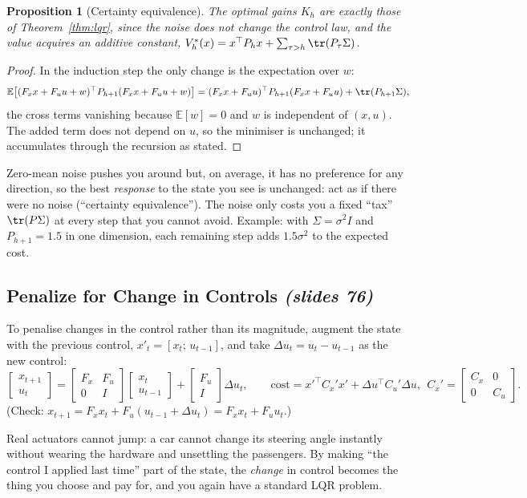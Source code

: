 \documentclass[11pt,a4paper]{article}
\newcommand{\E}{\mathbb{E}}
\newcommand{\slides}[1]{\emph{(slides #1)}}
\theoremstyle{plain}
\newtheorem{proposition}[theorem]{Proposition}
\theoremstyle{definition}
\theoremstyle{remark}
\begin{document}
\begin{proposition}[Certainty equivalence]\label{prop:ce}
The optimal gains $K_h$ are exactly those of Theorem~\ref{thm:lqr}, since the noise does not change the control law, and the value acquires an additive constant, $V^*_h(x)=x^\top P_hx+\sum_{\tau>h}\tr(P_\tau\Sigma)$.
\end{proposition}
\begin{proof}
In the induction step the only change is the expectation over $w$:
\[
\E\big[(F_xx+F_uu+w)^\top P_{h+1}(F_xx+F_uu+w)\big]=(F_xx+F_uu)^\top P_{h+1}(F_xx+F_uu)+\tr(P_{h+1}\Sigma),
\]
the cross terms vanishing because $\E[w]=0$ and $w$ is independent of $(x,u)$. The added term does not depend on $u$, so the minimiser is unchanged; it accumulates through the recursion as stated.
\end{proof}
\begin{intuition}
Zero-mean noise pushes you around but, on average, it has no preference for any direction, so the best \emph{response} to the state you see is unchanged: act as if there were no noise (``certainty equivalence''). The noise only costs you a fixed ``tax'' $\tr(P\Sigma)$ at every step that you cannot avoid. Example: with $\Sigma=\sigma^2I$ and $P_{h+1}=1.5$ in one dimension, each remaining step adds $1.5\sigma^2$ to the expected cost.
\end{intuition}

\subsection{Penalize for Change in Controls \slides{76}}

To penalise changes in the control rather than its magnitude, augment the state with the previous control, $x'_t=[x_t;\,u_{t-1}]$, and take $\Delta u_t=u_t-u_{t-1}$ as the new control:
\[
\begin{bmatrix}x_{t+1}\\u_t\end{bmatrix}=\begin{bmatrix}F_x&F_u\\0&I\end{bmatrix}\begin{bmatrix}x_t\\u_{t-1}\end{bmatrix}+\begin{bmatrix}F_u\\I\end{bmatrix}\Delta u_t,\qquad
\text{cost}=x'^\top C_x'x'+\Delta u^\top C_u'\Delta u,\ \ C_x'=\begin{bmatrix}C_x&0\\0&C_u\end{bmatrix}.
\]
(Check: $x_{t+1}=F_xx_t+F_u(u_{t-1}+\Delta u_t)=F_xx_t+F_uu_t$.)
\begin{intuition}
Real actuators cannot jump: a car cannot change its steering angle instantly without wearing the hardware and unsettling the passengers. By making ``the control I applied last time'' part of the state, the \emph{change} in control becomes the thing you choose and pay for, and you again have a standard LQR problem.
\end{intuition}
\end{document}
